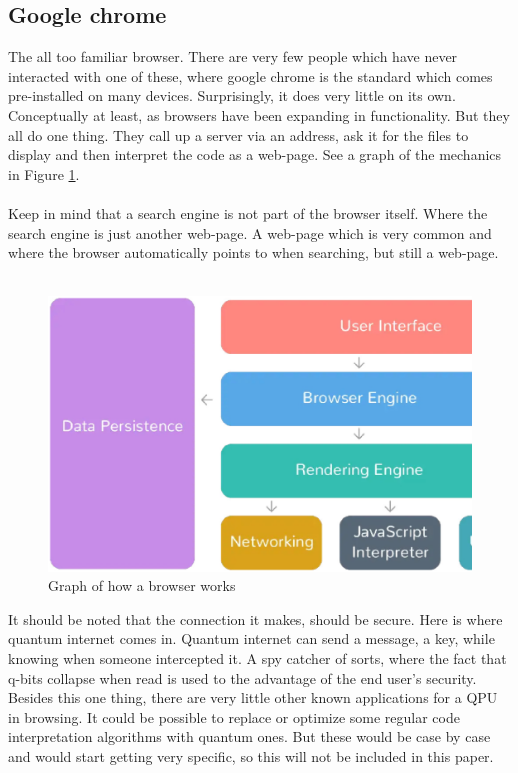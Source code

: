 \subsection{Google chrome}
The all too familiar browser. There are very few people which have never interacted with one of these, where google chrome is the standard which comes pre-installed on many devices. Surprisingly, it does very little on its own. Conceptually at least, as browsers have been expanding in functionality. But they all do one thing. They call up a server via an address, ask it for the files to display and then interpret the code as a web-page. See a graph of the mechanics in Figure \ref{fig:sycamore_processor}.
\\\\
Keep in mind that a search engine is not part of the browser itself. Where the search engine is just another web-page. A web-page which is very common and where the browser automatically points to when searching, but still a web-page. 
\\\\
\begin{figure}[t]
  \centering
  \includegraphics[scale=0.5]{img/Components-of-a-browser.ps}
  \caption{Graph of how a browser works}
  \label{fig:sycamore_processor}
\end{figure}
It should be noted that the connection it makes, should be secure. Here is where quantum internet comes in. Quantum internet can send a message, a key, while knowing when someone intercepted it. A spy catcher of sorts, where the fact that q-bits collapse when read is used to the advantage of the end user's security. Besides this one thing, there are very little other known applications for a QPU in browsing. It could be possible to replace or optimize some regular code interpretation algorithms with quantum ones. But these would be case by case and would start getting very specific, so this will not be included in this paper.
\newpage
